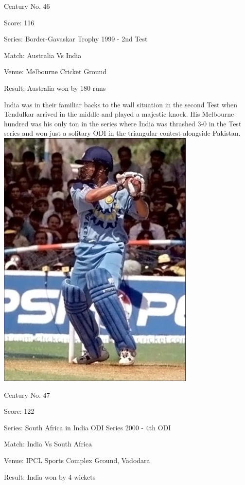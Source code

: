\documentclass[11pt, a4paper]{article}
\begin{document}
Century No. 46 

Score: 116 

Series: Border-Gavaskar Trophy 1999 - 2nd Test 

Match: Australia Vs India 

Venue: Melbourne Cricket Ground 

Result: Australia won by 180 runs 

India was in their familiar backs to the wall situation in the second Test when Tendulkar arrived in the middle and played a majestic knock. His Melbourne hundred was his only ton in the series where India was thrashed 3-0 in the Test series and won just a solitary ODI in the triangular contest alongside Pakistan.
\newpage
\includegraphics[height=0.8\textheight]{pics/47.jpg}

Century No. 47 

Score: 122 

Series: South Africa in India ODI Series 2000 - 4th ODI 

Match: India Vs South Africa 

Venue: IPCL Sports Complex Ground, Vadodara 

Result: India won by 4 wickets 
\end{document}
